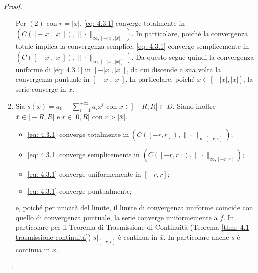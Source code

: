 \begin{proof}
\begin{enumerate}
        Per $(2)$ con $r=|x|$, \eqref{eq: 4.3.1} converge totalmente in $(C([-|x|,|x|]), \|\cdot\|_{\infty, [-|x|,|x|]})$. In particolare, poiché la convergenza totale implica la convergenza semplice, \eqref{eq: 4.3.1} converge semplicemente in $(C([-|x|,|x|]), \|\cdot\|_{\infty, [-|x|,|x|]})$. Da questo segue quindi la convergenza uniforme di \eqref{eq: 4.3.1} in $[-|x|,|x|]$, da cui discende a sua volta la convergenza puntuale in $[-|x|,|x|]$. In particolare, poiché $x\in [-|x|,|x|]$, la serie converge in $x$.
        \item Sia $s(x) = a_0+\sum_{i=1}^{+\infty}a_ix^i$ con $x \in ]-R,R[\subset D$. Siano inoltre $\bar x\in ]-R,R[$ e $r\in ]0,R[$ con $r>|\bar x|$. 
        \begin{itemize}[label=$\implies$]
            \item \eqref{eq: 4.3.1} converge totalmente in $(C([-r,r]), \|\cdot\|_{\infty, [-r,r]})$;
            \item \eqref{eq: 4.3.1} converge semplicemente in $(C([-r,r]), \|\cdot\|_{\infty, [-r,r]})$;
            \item \eqref{eq: 4.3.1} converge uniformemente in $[-r,r]$;
            \item \eqref{eq: 4.3.1} converge puntualmente;
        \end{itemize}
        e, poiché per unicità del limite, il limite di convergenza uniforme coincide con quello di convergenza puntuale, la serie converge uniformemente a $f$. In particolare per il Teorema di Trasmissione di Continuità (Teorema \ref{thm: 4.1 trasmissione continuità}) $s|_{[-r,r]}$ è continua in $\bar x$. In particolare anche $s$ è continua in $\bar x$.
    \end{enumerate}
\end{proof}

